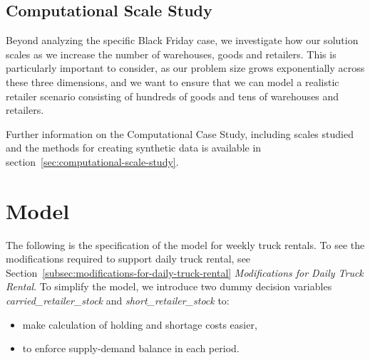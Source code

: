\documentclass[a4paper,12pt]{article}
\begin{document}
\subsection{Computational Scale Study}\label{subsec:computational-scale-study}

Beyond analyzing the specific Black Friday case, we investigate how our solution scales as we increase the number of warehouses, goods and retailers.
This is particularly important to consider, as our problem size grows exponentially across these three dimensions, and we want to ensure that we can model a realistic retailer scenario consisting of hundreds of goods and tens of warehouses and retailers.

Further information on the Computational Case Study, including scales studied and the methods for creating synthetic data is available in section~\ref{sec:computational-scale-study}.





\section{Model}\label{sec:model}

The following is the specification of the model for weekly truck rentals.
To see the modifications required to support daily truck rental, see Section~\ref{subsec:modifications-for-daily-truck-rental} \textit{Modifications for Daily Truck Rental}.
To simplify the model, we introduce two dummy decision variables \textit{carried\_retailer\_stock} and \textit{short\_retailer\_stock} to:
\begin{itemize}
    \item make calculation of holding and shortage costs easier,
    \item to enforce supply-demand balance in each period.
\end{itemize}
\end{document}
